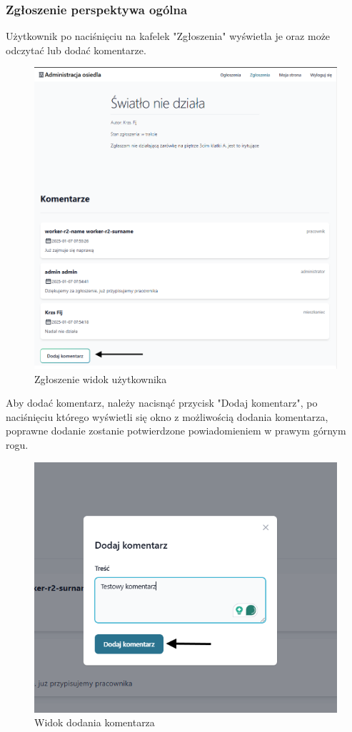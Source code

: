 \subsubsection{Zgłoszenie perspektywa ogólna}
Użytkownik po naciśnięciu na kafelek "Zgłoszenia" wyświetla je oraz może odczytać lub dodać komentarze.
\begin{figure}[H]
    \centering
    \includegraphics[width=0.75\linewidth]{img/req_user.png}
    \caption{Zgłoszenie widok użytkownika}
    \label{fig:enter-label}
\end{figure}
Aby dodać komentarz, należy nacisnąć przycisk "Dodaj komentarz", po naciśnięciu którego wyświetli się okno z możliwością dodania komentarza, poprawne dodanie zostanie potwierdzone powiadomieniem w prawym górnym rogu.
\begin{figure}[H]
    \centering
    \includegraphics[width=0.5\linewidth]{img/add_comment.png}
    \caption{Widok dodania komentarza}
    \label{fig:add_comment_view}
\end{figure}
